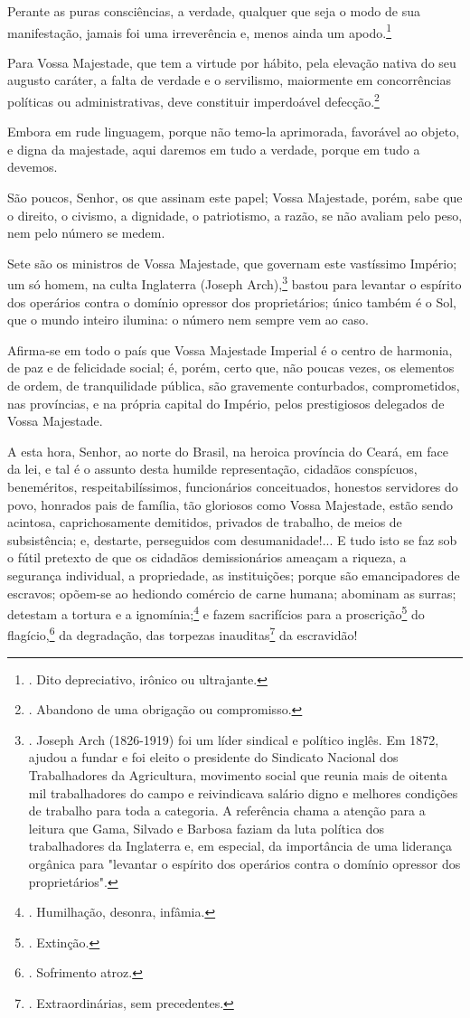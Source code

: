 Perante as puras consciências, a verdade, qualquer que seja o modo de
sua manifestação, jamais foi uma irreverência e, menos ainda um
apodo.\footnote{. Dito depreciativo, irônico ou ultrajante.}

Para Vossa Majestade, que tem a virtude por hábito, pela elevação nativa
do seu augusto caráter, a falta de verdade e o servilismo, maiormente em
concorrências políticas ou administrativas, deve constituir imperdoável
defecção.\footnote{. Abandono de uma obrigação ou compromisso.}

Embora em rude linguagem, porque não temo-la aprimorada, favorável ao
objeto, e digna da majestade, aqui daremos em tudo a verdade, porque em
tudo a devemos.

São poucos, Senhor, os que assinam este papel; Vossa Majestade, porém,
sabe que o direito, o civismo, a dignidade, o patriotismo, a razão, se
não avaliam pelo peso, nem pelo número se medem.

Sete são os ministros de Vossa Majestade, que governam este vastíssimo
Império; um só homem, na culta Inglaterra (Joseph Arch),\footnote{.
  Joseph Arch (1826-1919) foi um líder sindical e político inglês. Em
  1872, ajudou a fundar e foi eleito o presidente do Sindicato Nacional
  dos Trabalhadores da Agricultura, movimento social que reunia mais de
  oitenta mil trabalhadores do campo e reivindicava salário digno e
  melhores condições de trabalho para toda a categoria. A referência
  chama a atenção para a leitura que Gama, Silvado e Barbosa faziam da
  luta política dos trabalhadores da Inglaterra e, em especial, da
  importância de uma liderança orgânica para "levantar o espírito dos
  operários contra o domínio opressor dos proprietários".} bastou para
levantar o espírito dos operários contra o domínio opressor dos
proprietários; único também é o Sol, que o mundo inteiro ilumina: o
número nem sempre vem ao caso.

Afirma-se em todo o país que Vossa Majestade Imperial é o centro de
harmonia, de paz e de felicidade social; é, porém, certo que, não poucas
vezes, os elementos de ordem, de tranquilidade pública, são gravemente
conturbados, comprometidos, nas províncias, e na própria capital do
Império, pelos prestigiosos delegados de Vossa Majestade.

A esta hora, Senhor, ao norte do Brasil, na heroica província do Ceará,
em face da lei, e tal é o assunto desta humilde representação, cidadãos
conspícuos, beneméritos, respeitabilíssimos, funcionários conceituados,
honestos servidores do povo, honrados pais de família, tão gloriosos
como Vossa Majestade, estão sendo acintosa, caprichosamente demitidos,
privados de trabalho, de meios de subsistência; e, destarte, perseguidos
com desumanidade!... E tudo isto se faz sob o fútil pretexto de que os
cidadãos demissionários ameaçam a riqueza, a segurança individual, a
propriedade, as instituições; porque são emancipadores de escravos;
opõem-se ao hediondo comércio de carne humana; abominam as surras;
detestam a tortura e a ignomínia;\footnote{. Humilhação, desonra,
  infâmia.} e fazem sacrifícios para a proscrição\footnote{. Extinção.}
do flagício,\footnote{. Sofrimento atroz.} da degradação, das torpezas
inauditas\footnote{. Extraordinárias, sem precedentes.} da escravidão!

